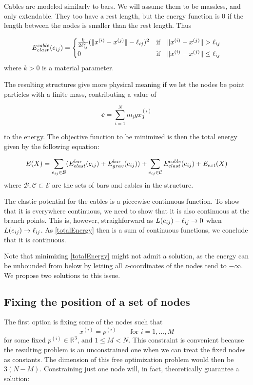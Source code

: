 Cables are modeled similarly to bars. We will assume them to be massless, and only extendable. They too have a rest length, but the energy function is $0$ if the length between the nodes is smaller than the rest length. Thus

\begin{equation}
E^{cable}_{elast}(e_{ij}) = \begin{cases}
    \frac{k}{2\ell_{ij}^2}(\lVert x^{(i)} - x^{(j)}\rVert-\ell_{ij})^2 & \text{if} \quad \lVert x^{(i)} - x^{(j)}\rVert >\ell_{ij}\\
    0 & \text{if} \quad \lVert x^{(i)} - x^{(j)}\rVert \leq \ell_{ij}
    \end{cases}
    \label{cableElast}
\end{equation}
where $k > 0$ is a material parameter.

The resulting structures give more physical meaning if we let the nodes be point particles with a finite mass, contributing a value of

\begin{equation}
    \ee = \sum_{i=1}^{N} m_i g x_3^{(i)}
    \label{externalEnergy}
\end{equation}

to the energy. The objective function to be minimized is then the total energy given by the following equation:

\begin{equation}
    E(X) = \sum\limits_{e_{ij} \in \mathcal{B}}(E^{bar}_{elast}(e_{ij}) + E^{bar}_{grav}(e_{ij})) + \sum\limits_{e_{ij} \in \mathcal{C}} E^{cable}_{elast}(e_{ij}) + E_{ext}(X)
    \label{totalEnergy}
\end{equation} where $\mathcal{B}, \mathcal{C} \subset \mathcal{E}$ are the sets of bars and cables in the structure.

The elastic potential for the cables is a piecewise continuous function. To show that it is everywhere continuous, we need to show that it is also continuous at the branch points. This is, however, straighforward as $L(e_{ij}) - \ell_{ij} \rightarrow 0$ when $L(e_{ij}) \rightarrow \ell_{ij}$. As \eqref{totalEnergy} then is a sum of continuous functions, we conclude that it is continuous.

Note that minimizing \eqref{totalEnergy} might not admit a solution, as the energy can be unbounded from below by letting all $z$-coordinates of the nodes tend to $-\infty$. We propose two solutions to this issue.

\subsection{Fixing the position of a set of nodes}\label{subsec:fix}
The first option is fixing some of the nodes such that
\begin{equation}
    x^{(i)} = p^{(i)} \qquad \text{for } i = 1,...,M
    \label{fixednode}
\end{equation} for some fixed $p^{(i)} \in \mathbb{R}^3$, and $1\leq M < N$. This constraint is convenient because the resulting problem is an unconstrained one when we can treat the fixed nodes as constants. The dimension of this free optimization problem would then be $3(N-M)$. Constraining just one node will, in fact, theoretically guarantee a solution:

